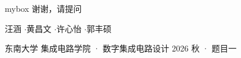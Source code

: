 \documentclass[10pt,aspectratio=43,mathserif]{beamer}
\begin{document}
\section*{}
\begin{frame}
\begin{center}
  \begin{minipage}{1\textwidth}
    \centering
    \begin{beamercolorbox}[wd=0.72\textwidth, rounded=true, shadow=true]{mybox}
      \LARGE \centering 谢谢，请提问
    \end{beamercolorbox}
  \end{minipage}
\end{center}
\vspace{5mm}
\begin{center}
  \footnotesize
  汪涵  \quad$\cdot$\quad 黄昌文  \quad$\cdot$\quad 许心怡  \quad$\cdot$\quad 郭丰硕 
\end{center}
\vspace{4mm}
\begin{center}
  \scriptsize
  东南大学 \; 集成电路学院 \; · \; 数字集成电路设计 2026 秋 \; · \; 题目一
\end{center}
\end{frame}
\end{document}
